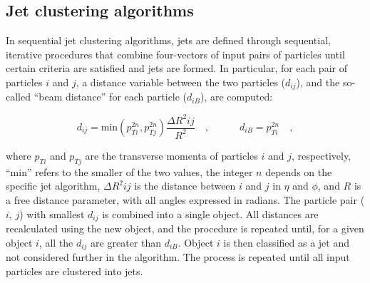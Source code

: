 \subsection{Jet clustering algorithms}\label{subsec:jetsalgo}

In sequential jet clustering algorithms, jets are defined through sequential, iterative procedures that combine four-vectors of input pairs of particles until certain criteria are satisfied and jets are formed. In particular, for each pair of particles $i$ and $j$, a distance variable between the two particles ($d_{ij}$), and the so-called ``beam distance'' for each particle ($d_{iB}$), are computed:
 
\begin{equation}\label{eqn:jetalgo}
d_{ij} = \mathrm{min}(p_{Ti}^{2n},p_{Tj}^{2n})\frac{\Delta R^2{ij}}{R^2}\quad,\quad\quad\quad
d_{iB} = p_{Ti}^{2n}\quad,
\end{equation} 

where $p_{Ti}$ and $p_{Tj}$ are the transverse momenta of particles $i$ and $j$, respectively, ``min'' refers to the smaller of the two \pt values, the integer $n$ depends on the specific jet algorithm, $\Delta R^2{ij}$ is the distance between $i$ and $j$ in $\eta$ and $\phi$, and $R$ is a free distance parameter, with all angles expressed in radians. The particle pair ($i$, $j$) with smallest $d_{ij}$ is combined into a single object. All distances are recalculated using the new object, and the procedure is repeated until, for a given object $i$, all the $d_{ij}$ are greater than $d_{iB}$. Object $i$ is then classified as a jet and not considered further in the algorithm. The process is repeated until all input particles are clustered into jets.

